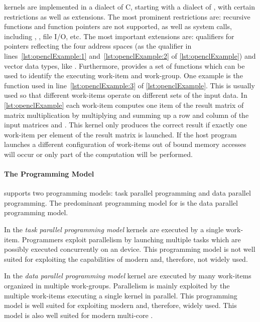 \OpenCL kernels are implemented in a dialect of C, starting with  a dialect of \Cpp, with certain restrictions as well as extensions.
The most prominent restrictions are:
recursive functions and function pointers are not supported, as well as system calls, including , , file I/O, etc.
The most important extensions are:
qualifiers for pointers reflecting the four address spaces (as the  qualifier in lines~\ref{lst:openclExample:1} and~\ref{lst:openclExample:2} of \autoref{lst:openclExample}) and vector data types, like .
Furthermore, \OpenCL provides a set of functions which can be used to identify the executing work-item and work-group.
One example is the  function used in line~\ref{lst:openclExample:3} of \autoref{lst:openclExample}.
This is usually used so that different work-items operate on different sets of the input data.
In \autoref{lst:openclExample} each work-item computes one item of the result matrix  of matrix multiplication by multiplying and summing up a row and column of the input matrices  and .
This kernel only produces the correct result if exactly one work-item per element of the result matrix is launched.
If the host program launches a different configuration of work-items out of bound memory accesses will occur or only part of the computation will be performed.

\paragraph{The \OpenCL Programming Model}

\OpenCL supports two programming models: task parallel programming and data parallel programming.
The predominant programming model for \OpenCL is the data parallel programming model.

In the \emph{task parallel programming model} kernels are executed by a single work-item.
Programmers exploit parallelism by launching multiple tasks which are possibly executed concurrently on an \OpenCL device.
This programming model is not well suited for exploiting the capabilities of modern \GPUs and, therefore, not widely used.

In the \emph{data parallel programming model} kernel are executed by many work-items organized in multiple work-groups.
Parallelism is mainly exploited by the multiple work-items executing a single kernel in parallel.
This programming model is well suited for exploiting modern \GPUs and, therefore, widely used.
This model is also well suited for modern multi-core \CPUs.

